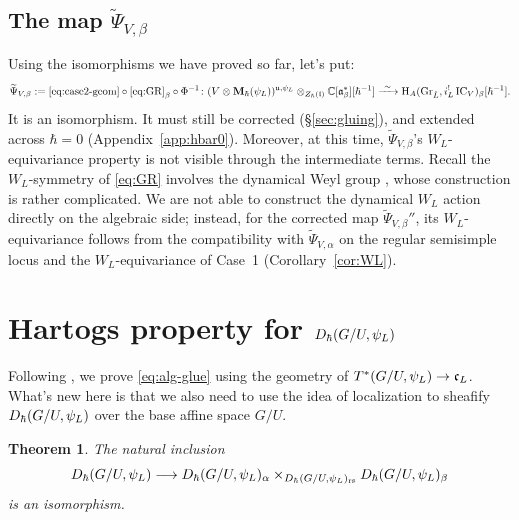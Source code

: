 \documentclass{article}
\theoremstyle{plain}
\newtheorem{theorem}{Theorem}[section]
\theoremstyle{definition}
\theoremstyle{remark}
\numberwithin{equation}{section}
\begin{document}
\subsection{The map \texorpdfstring{$\widetilde\Psi_{V,\beta}$}{Psi\_beta}}\label{sec:PsiB}
Using the isomorphisms we have proved so far, let's put:
\begin{equation}\label{eq:PsiB-def}
\widetilde\Psi_{V,\beta}:=\eqref{eq:case2-geom}\circ\eqref{eq:GR}_\beta\circ\Phi^{-1}\colon(V\otimes\bM_\hbar(\psiL))^{\fraku,\psiL}\otimes_{\Zh(\frakl)}\Cbe[\hbar^{-1}]\xrightarrow{\ \sim\ }\H_A(\GrL,i_L^!\IC_V)_\beta[\hbar^{-1}] .
\end{equation}
It is an isomorphism. It must still be corrected (\S\ref{sec:gluing}), and extended across $\hbar=0$ (Appendix~\ref{app:hbar0}). Moreover, at this time, $\widetilde\Psi_{V,\beta}$'s $W_L$-equivariance property is not visible through the intermediate terms. Recall the $W_L$-symmetry of \eqref{eq:GR} involves the dynamical Weyl group \cite[\S\S2.5--2.6]{ginzburg2014differentialoperatorsguaffine}, whose construction is rather complicated. We are not able to construct the dynamical $W_L$ action directly on the algebraic side; instead, for the corrected map $\widetilde \Psi_{V,\beta}''$, its $W_L$-equivariance follows from the compatibility with $\widetilde \Psi_{V,\alpha}$ on the regular semisimple locus and the $W_L$-equivariance of Case~1 (Corollary~\ref{cor:WL}).


\section{Hartogs property for $D_\hbar(G/U,\psi_L)$}\label{sec:hartogs}


Following \cite[\S3.5]{macerato2023leviequivariantrestrictionsphericalperverse}, we prove \eqref{eq:alg-glue} using the geometry of $T^*(G/U,\psi_L)\to\mathfrak{c}_L$. What's new here is that we also need to use the idea of localization to sheafify $D_\hbar(G/U,\psi_L)$ over the base affine space $G/U$.

\begin{theorem}\label{thm:alg-glue}
The natural inclusion
\[
D_\hbar(G/U,\psi_L)\longrightarrow D_\hbar(G/U,\psi_L)_\alpha\times_{D_\hbar(G/U,\psi_L)_{\mathrm{rs}}}D_\hbar(G/U,\psi_L)_\beta
\]
is an isomorphism.
\end{theorem}
\end{document}
